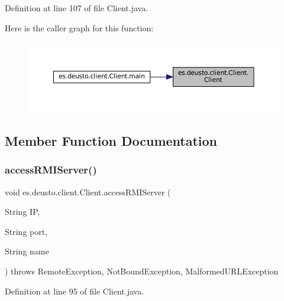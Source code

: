 Definition at line 107 of file Client.\+java.

Here is the caller graph for this function\+:\nopagebreak
\begin{figure}[H]
\begin{center}
\leavevmode
\includegraphics[width=350pt]{classes_1_1deusto_1_1client_1_1_client_a71c03e318a72447da873297f3364f67f_icgraph}
\end{center}
\end{figure}


\subsection{Member Function Documentation}
\mbox{\label{classes_1_1deusto_1_1client_1_1_client_aaed61e092ef0cfa2b78065df6e6b0f55}} 
\subsubsection{\texorpdfstring{accessRMIServer()}{accessRMIServer()}}
{\footnotesize\ttfamily void es.\+deusto.\+client.\+Client.\+access\+R\+M\+I\+Server (\begin{DoxyParamCaption}\item[{String}]{IP,  }\item[{String}]{port,  }\item[{String}]{name }\end{DoxyParamCaption}) throws Remote\+Exception, Not\+Bound\+Exception, Malformed\+U\+R\+L\+Exception}



Definition at line 95 of file Client.\+java.

\mbox{\label{classes_1_1deusto_1_1client_1_1_client_ab3ebcc9daf4719fe0c9354a49d5957e4}} 
